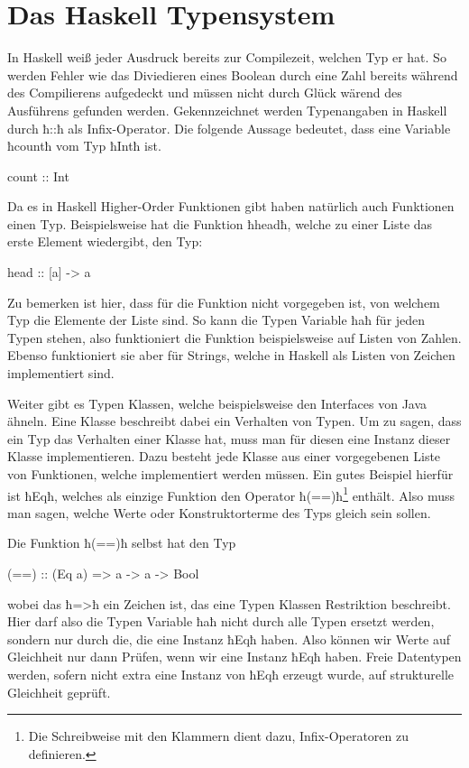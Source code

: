 \section{Das Haskell Typensystem}
In Haskell weiß jeder Ausdruck bereits zur Compilezeit, welchen Typ er hat. So
werden Fehler wie das Diviedieren eines Boolean durch eine Zahl bereits während
des Compilierens aufgedeckt und müssen nicht durch Glück wärend des Ausführens
gefunden werden. Gekennzeichnet werden Typenangaben in Haskell durch ħ::ħ als
Infix-Operator. Die folgende Aussage bedeutet, dass eine Variable ħcountħ vom Typ
ħIntħ ist.
\begin{hcode}
count :: Int
\end{hcode}
Da es in Haskell Higher-Order Funktionen gibt haben natürlich auch Funktionen
einen Typ. Beispielsweise hat die Funktion ħheadħ, welche zu einer Liste das
erste Element wiedergibt, den Typ:
\begin{hcode}
head :: [a] -> a
\end{hcode}
Zu bemerken ist hier, dass für die Funktion nicht vorgegeben ist, von welchem
Typ die Elemente der Liste sind. So kann die Typen Variable ħaħ für jeden Typen
stehen, also funktioniert die Funktion beispielsweise auf Listen von Zahlen.
Ebenso funktioniert sie aber für Strings, welche in Haskell als Listen von
Zeichen implementiert sind.

Weiter gibt es Typen Klassen, welche beispielsweise den Interfaces von Java
ähneln.  Eine Klasse beschreibt dabei ein Verhalten von Typen. Um zu sagen,
dass ein Typ das Verhalten einer Klasse hat, muss man für diesen eine Instanz
dieser Klasse implementieren.
Dazu besteht jede Klasse aus einer vorgegebenen Liste von Funktionen, welche
implementiert werden müssen. Ein gutes Beispiel hierfür ist ħEqħ, welches als
einzige Funktion den Operator ħ(==)ħ\footnote{Die Schreibweise mit den Klammern
dient dazu, Infix-Operatoren zu definieren.} enthält. Also muss man sagen,
welche Werte oder Konstruktorterme des Typs gleich sein sollen.

Die Funktion ħ(==)ħ selbst hat den Typ
\begin{hcode}
(==) :: (Eq a) => a -> a -> Bool
\end{hcode}
wobei das ħ=>ħ ein Zeichen ist, das eine Typen Klassen Restriktion beschreibt.
Hier darf also die Typen Variable ħaħ nicht durch alle Typen ersetzt werden,
sondern nur durch die, die eine Instanz ħEqħ haben. Also können wir Werte auf
Gleichheit nur dann Prüfen, wenn wir eine Instanz ħEqħ haben. Freie Datentypen
werden, sofern nicht extra eine Instanz von ħEqħ erzeugt wurde, auf
strukturelle Gleichheit geprüft.

